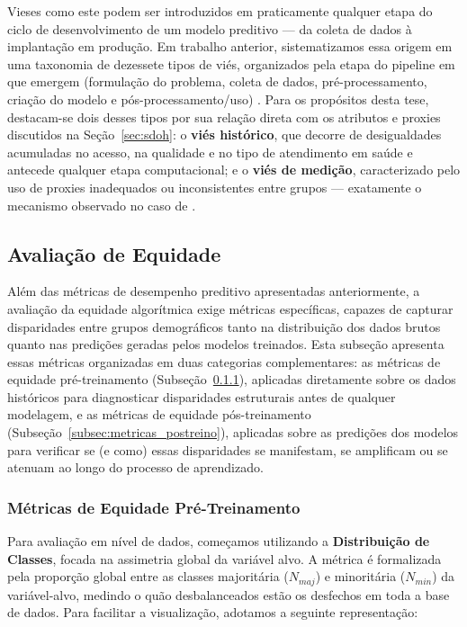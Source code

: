 Vieses como este podem ser introduzidos em praticamente qualquer etapa do ciclo de desenvolvimento de um modelo preditivo — da coleta de dados à implantação em produção. Em trabalho anterior, sistematizamos essa origem em uma taxonomia de dezessete tipos de viés, organizados pela etapa do pipeline em que emergem (formulação do problema, coleta de dados, pré-processamento, criação do modelo e pós-processamento/uso) \cite{deconstruindo}. Para os propósitos desta tese, destacam-se dois desses tipos por sua relação direta com os atributos e proxies discutidos na Seção~\ref{sec:sdoh}: o \textbf{viés histórico}, que decorre de desigualdades acumuladas no acesso, na qualidade e no tipo de atendimento em saúde e antecede qualquer etapa computacional; e o \textbf{viés de medição}, caracterizado pelo uso de proxies inadequados ou inconsistentes entre grupos — exatamente o mecanismo observado no caso de \citet{obermeyer2019dissecting}.

\subsection{Avaliação de Equidade}

Além das métricas de desempenho preditivo apresentadas anteriormente, a avaliação da equidade algorítmica exige métricas específicas, capazes de capturar disparidades entre grupos demográficos tanto na distribuição dos dados brutos quanto nas predições geradas pelos modelos treinados. Esta subseção apresenta essas métricas organizadas em duas categorias complementares: as métricas de equidade pré-treinamento (Subseção~\ref{subsec:metricas_pretreino}), aplicadas diretamente sobre os dados históricos para diagnosticar disparidades estruturais antes de qualquer modelagem, e as métricas de equidade pós-treinamento (Subseção~\ref{subsec:metricas_postreino}), aplicadas sobre as predições dos modelos para verificar se (e como) essas disparidades se manifestam, se amplificam ou se atenuam ao longo do processo de aprendizado.

\subsubsection{Métricas de Equidade Pré-Treinamento}\label{subsec:metricas_pretreino}

Para avaliação em nível de dados, começamos utilizando a \textbf{Distribuição de Classes}, focada na assimetria global da variável alvo. A métrica é formalizada pela proporção global entre as classes majoritária ($N_{maj}$) e minoritária ($N_{min}$) da variável-alvo, medindo o quão desbalanceados estão os desfechos em toda a base de dados. Para facilitar a visualização, adotamos a seguinte representação:

